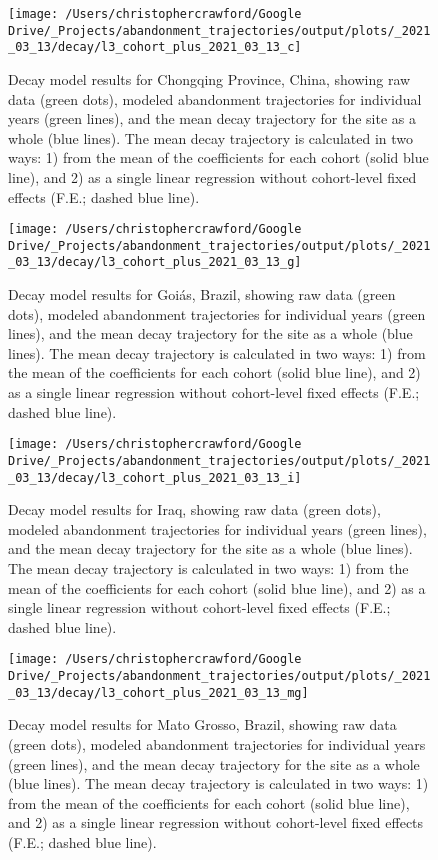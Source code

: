\documentclass[
]{article}
\begin{document}
\begin{figure}
\texttt{[image: /Users/christophercrawford/Google Drive/\_Projects/abandonment\_trajectories/output/plots/\_2021\_03\_13/decay/l3\_cohort\_plus\_2021\_03\_13\_c]} \caption{Decay model results for Chongqing Province, China, showing raw data (green dots), modeled abandonment trajectories for individual years (green lines), and the mean decay trajectory for the site as a whole (blue lines). The mean decay trajectory is calculated in two ways: 1) from the mean of the coefficients for each cohort (solid blue line), and 2) as a single linear regression without cohort-level fixed effects (F.E.; dashed blue line).}\label{fig:decay-model-indiv-site-c}
\end{figure}

\begin{figure}
\texttt{[image: /Users/christophercrawford/Google Drive/\_Projects/abandonment\_trajectories/output/plots/\_2021\_03\_13/decay/l3\_cohort\_plus\_2021\_03\_13\_g]} \caption{Decay model results for Goiás, Brazil, showing raw data (green dots), modeled abandonment trajectories for individual years (green lines), and the mean decay trajectory for the site as a whole (blue lines). The mean decay trajectory is calculated in two ways: 1) from the mean of the coefficients for each cohort (solid blue line), and 2) as a single linear regression without cohort-level fixed effects (F.E.; dashed blue line).}\label{fig:decay-model-indiv-site-g}
\end{figure}

\begin{figure}
\texttt{[image: /Users/christophercrawford/Google Drive/\_Projects/abandonment\_trajectories/output/plots/\_2021\_03\_13/decay/l3\_cohort\_plus\_2021\_03\_13\_i]} \caption{Decay model results for Iraq, showing raw data (green dots), modeled abandonment trajectories for individual years (green lines), and the mean decay trajectory for the site as a whole (blue lines). The mean decay trajectory is calculated in two ways: 1) from the mean of the coefficients for each cohort (solid blue line), and 2) as a single linear regression without cohort-level fixed effects (F.E.; dashed blue line).}\label{fig:decay-model-indiv-site-i}
\end{figure}

\begin{figure}
\texttt{[image: /Users/christophercrawford/Google Drive/\_Projects/abandonment\_trajectories/output/plots/\_2021\_03\_13/decay/l3\_cohort\_plus\_2021\_03\_13\_mg]} \caption{Decay model results for Mato Grosso, Brazil, showing raw data (green dots), modeled abandonment trajectories for individual years (green lines), and the mean decay trajectory for the site as a whole (blue lines). The mean decay trajectory is calculated in two ways: 1) from the mean of the coefficients for each cohort (solid blue line), and 2) as a single linear regression without cohort-level fixed effects (F.E.; dashed blue line).}\label{fig:decay-model-indiv-site-mg}
\end{figure}
\end{document}

